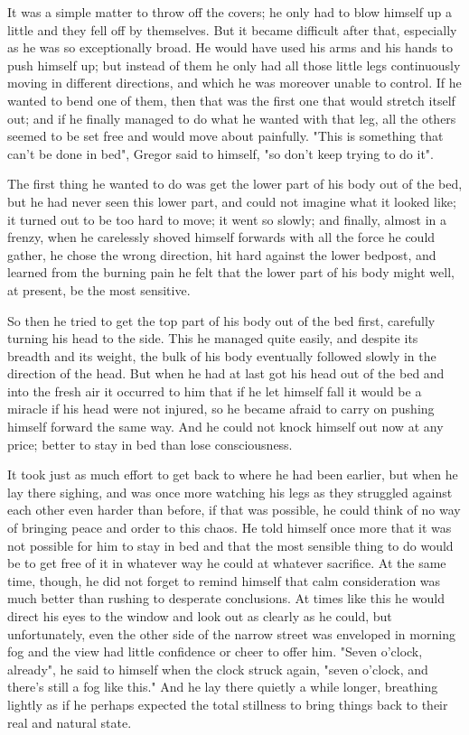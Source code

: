 \documentclass[12pt]{book}
\begin{document}
    It was a simple matter to throw off the covers; he only had to blow himself up a little and they fell off by themselves. But it became difficult after that, especially as he was so exceptionally broad. He would have used his arms and his hands to push himself up; but instead of them he only had all those little legs continuously moving in different directions, and which he was moreover unable to control. If he wanted to bend one of them, then that was the first one that would stretch itself out; and if he finally managed to do what he wanted with that leg, all the others seemed to be set free and would move about painfully. "This is something that can't be done in bed", Gregor said to himself, "so don't keep trying to do it".

    The first thing he wanted to do was get the lower part of his body out of the bed, but he had never seen this lower part, and could not imagine what it looked like; it turned out to be too hard to move; it went so slowly; and finally, almost in a frenzy, when he carelessly shoved himself forwards with all the force he could gather, he chose the wrong direction, hit hard against the lower bedpost, and learned from the burning pain he felt that the lower part of his body might well, at present, be the most sensitive.

    So then he tried to get the top part of his body out of the bed first, carefully turning his head to the side. This he managed quite easily, and despite its breadth and its weight, the bulk of his body eventually followed slowly in the direction of the head. But when he had at last got his head out of the bed and into the fresh air it occurred to him that if he let himself fall it would be a miracle if his head were not injured, so he became afraid to carry on pushing himself forward the same way. And he could not knock himself out now at any price; better to stay in bed than lose consciousness.

    It took just as much effort to get back to where he had been earlier, but when he lay there sighing, and was once more watching his legs as they struggled against each other even harder than before, if that was possible, he could think of no way of bringing peace and order to this chaos. He told himself once more that it was not possible for him to stay in bed and that the most sensible thing to do would be to get free of it in whatever way he could at whatever sacrifice. At the same time, though, he did not forget to remind himself that calm consideration was much better than rushing to desperate conclusions. At times like this he would direct his eyes to the window and look out as clearly as he could, but unfortunately, even the other side of the narrow street was enveloped in morning fog and the view had little confidence or cheer to offer him. "Seven o'clock, already", he said to himself when the clock struck again, "seven o'clock, and there's still a fog like this." And he lay there quietly a while longer, breathing lightly as if he perhaps expected the total stillness to bring things back to their real and natural state.
\end{document}
